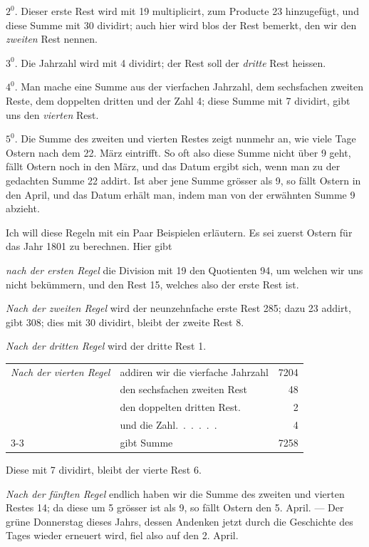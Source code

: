 $2^{0}$. Dieser erste Rest wird mit 19 multiplicirt, zum Producte 23 hinzugefügt,
und diese Summe mit 30 dividirt; auch hier wird blos der Rest bemerkt,
den wir den \textit{zweiten} Rest nennen.

$3^{0}$. Die Jahrzahl wird mit 4 dividirt; der Rest soll der \textit{dritte} Rest heissen.

$4^{0}$. Man mache eine Summe aus der vierfachen Jahrzahl, dem sechsfachen
zweiten Reste, dem doppelten dritten und der Zahl 4; diese Summe mit 7 dividirt,
gibt uns den \textit{vierten} Rest.

$5^{0}$. Die Summe des zweiten und vierten Restes zeigt nunmehr an, wie
viele Tage Ostern nach dem 22. März eintrifft. So oft also diese Summe nicht
über 9 geht, fällt Ostern noch in den März, und das Datum ergibt sich, wenn
man zu der gedachten Summe 22 addirt. Ist aber jene Summe grösser als 9,
so fällt Ostern in den April, und das Datum erhält man, indem man von der
erwähnten Summe 9 abzieht.

Ich will diese Regeln mit ein Paar Beispielen erläutern. Es sei zuerst
Ostern für das Jahr 1801 zu berechnen. Hier gibt

\textit{nach der ersten Regel} die Division mit 19 den Quotienten 94, um welchen
wir uns nicht bekümmern, und den Rest 15, welches also der erste Rest ist.

\textit{Nach der zweiten Regel} wird der neunzehnfache erste Rest 285; dazu 23
addirt, gibt 308; dies mit 30 dividirt, bleibt der zweite Rest 8.

\textit{Nach der dritten Regel} wird der dritte Rest 1.
%

\begin{center}\small
\begin{tabular}{llr}
\textit{Nach der vierten Regel} & addiren wir die vierfache Jahrzahl &7204\\
&den sechsfachen zweiten Rest &48\\
&den doppelten dritten Rest\quad . &2\\
&und die Zahl\quad .\ .\ .\ .\ .\ . &4\\\cline{3-3}
&\hfill gibt Summe &7258
\end{tabular}
\end{center}
Diese mit 7 dividirt, bleibt der vierte Rest 6.

\textit{Nach der fünften Regel} endlich haben wir die Summe des zweiten und vierten
Restes 14; da diese um 5 grösser ist als 9, so fällt Ostern den 5. April. —
Der grüne Donnerstag dieses Jahrs, dessen Andenken jetzt durch die Geschichte
des Tages wieder erneuert wird, fiel also auf den 2. April.

